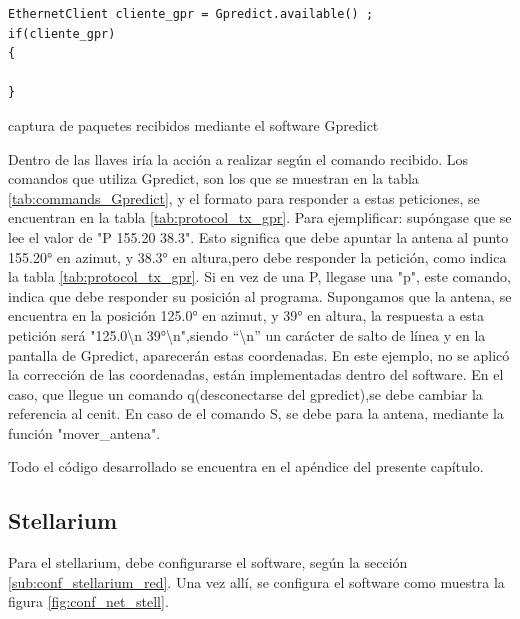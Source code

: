 \begin{listing}[ht]
	\begin{verbatim}
EthernetClient cliente_gpr = Gpredict.available() ;
if(cliente_gpr)
{

}
	\end{verbatim}
\vspace{-5mm}
\caption{captura de paquetes recibidos mediante el software Gpredict}
\label{cod:cliente_gpr}
\end{listing}

Dentro de las llaves iría la acción a realizar según el comando recibido. Los comandos que utiliza Gpredict, son los que se muestran en la tabla \ref{tab:commands_Gpredict}, y el formato para responder a estas peticiones, se encuentran en la tabla \ref{tab:protocol_tx_gpr}.
Para ejemplificar: supóngase que se lee el valor de "P 155.20 38.3". Esto significa que debe apuntar la antena al punto 155.20° en azimut, y 38.3° en altura,pero  debe responder la petición, como indica la tabla \ref{tab:protocol_tx_gpr}. Si en vez de una P, llegase una "p", este comando, indica que debe responder su posición al programa. Supongamos que la antena, se encuentra en la posición 125.0° en azimut, y 39° en altura, la respuesta a esta petición será "125.0\textbackslash n 39°\textbackslash n",siendo ``\textbackslash n'' un carácter de salto de línea  y en la pantalla de Gpredict, aparecerán estas coordenadas. En este ejemplo, no se aplicó la corrección de las coordenadas, están implementadas dentro del software. En el caso, que llegue un comando q(desconectarse del gpredict),se debe cambiar la referencia al cenit. En caso de el comando S, se debe para la antena, mediante la función "mover\_antena". 

Todo el código desarrollado se encuentra en el apéndice del presente capítulo. 




\subsection{Stellarium}

Para el stellarium, debe configurarse el software, según la sección \ref{sub:conf_stellarium_red}. Una vez allí, se configura el software como muestra la figura \ref{fig:conf_net_stell}. 

